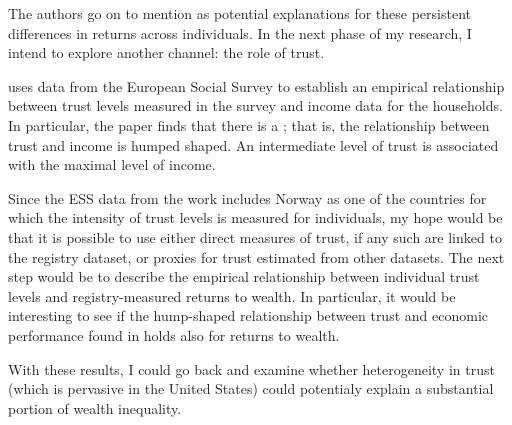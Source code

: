 \documentclass{scrartcl}
\begin{document}
The authors go on to mention  as potential explanations for these persistent differences in returns across individuals. In the next phase of my research, I intend to explore another channel: the role of trust.

\cite{jbpglg2016} uses data from the European Social Survey to establish an empirical relationship between trust levels measured in the survey and income data for the households. In particular, the paper finds that there is a ; that is, the relationship between trust and income is humped shaped. An intermediate level of trust is associated with the maximal level of income. 

Since the ESS data from the \cite{jbpglg2016} work includes Norway as one of the countries for which the intensity of trust levels is measured for individuals, my hope would be that it is possible to use either direct measures of trust, if any such are linked to the registry dataset, or proxies for trust estimated from other datasets. The next step would be to describe the empirical relationship between individual trust levels and registry-measured returns to wealth. In particular, it would be interesting to see if the hump-shaped relationship between trust and economic performance found in \cite{jbpglg2016} holds also for returns to wealth.

With these results, I could go back and examine whether heterogeneity in trust (which is pervasive in the United States) could potentialy explain a substantial portion of wealth inequality. 
\end{document}
